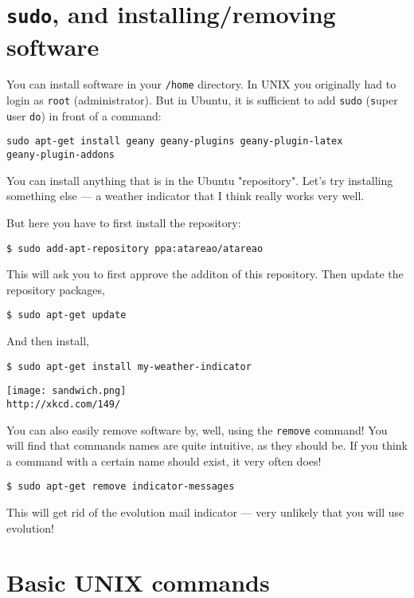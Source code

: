 \section{{\tt sudo}, and installing/removing software}

You can install software in your {\tt /home} directory. In UNIX you 
originally had to login as {\tt root} (administrator). But in Ubuntu, 
it is sufficient to add {\tt sudo} ({\tt s}uper {\tt u}ser {\tt do}) in 
front of a command: 
\begin{lstlisting}
sudo apt-get install geany geany-plugins geany-plugin-latex 
geany-plugin-addons
\end{lstlisting}

You can install anything that is in the Ubuntu "repository". Let's try 
installing something else --- a weather indicator that I think really works
very well. 

But here you have to first install the repository: 
\begin{lstlisting}
$ sudo add-apt-repository ppa:atareao/atareao
\end{lstlisting}

This will ask you to first approve the additon of this repository. Then 
update the repository packages, 
\begin{lstlisting}
$ sudo apt-get update 
\end{lstlisting}

And then install,
\begin{lstlisting}
$ sudo apt-get install my-weather-indicator
\end{lstlisting}

\begin{center}
	\texttt{[image: sandwich.png]}\\
	{\tt http://xkcd.com/149/}
\end{center}					

You can also easily remove software by, well, using the {\tt remove} 
command! You will find that commands names are quite intuitive, as they 
should be. If you think a command with a certain name should exist, it 
very often does!

\begin{lstlisting}
$ sudo apt-get remove indicator-messages
\end{lstlisting}

This will get rid of the evolution mail indicator --- very unlikely 
that you will use evolution!

\section{Basic UNIX commands}
 
